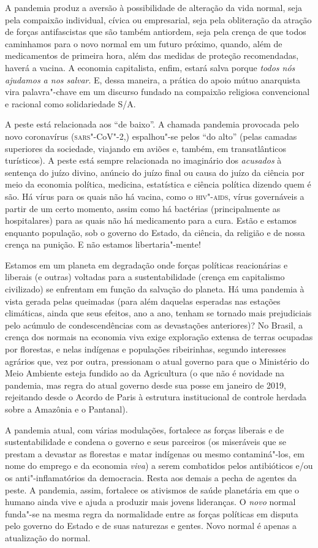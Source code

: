 A pandemia produz a aversão à possibilidade de alteração da vida normal,
seja pela compaixão individual, cívica ou empresarial, seja pela
obliteração da atração de forças antifascistas que são também antiordem,
seja pela crença de que todos caminhamos para o novo normal em um futuro
próximo, quando, além de medicamentos de primeira hora, além das medidas
de proteção recomendadas, haverá a vacina. A economia capitalista,
enfim, estará salva porque \emph{todos nós ajudamos a nos salvar}. E,
dessa maneira, a prática do apoio mútuo anarquista vira palavra"-chave em
um discurso fundado na compaixão religiosa convencional e racional como
solidariedade S/A.

A peste está relacionada aos ``de baixo''. A chamada pandemia provocada
pelo novo coronavírus (\textsc{sars}"-CoV"-2,) espalhou"-se pelos ``do alto'' (pelas
camadas superiores da sociedade, viajando em aviões e, também, em
transatlânticos turísticos). A peste está sempre relacionada no
imaginário dos \emph{acusados} à sentença do juízo divino, anúncio do
juízo final ou causa do juízo da ciência por meio da economia política,
medicina, estatística e ciência política dizendo quem é são. Há vírus
para os quais não há vacina, como o \textsc{hiv"-aids}, vírus governáveis a partir
de um certo momento, assim como há bactérias (principalmente as
hospitalares) para as quais não há medicamento para a cura. Estão e
estamos enquanto população, sob o governo do Estado, da ciência, da
religião e de nossa crença na punição. E não estamos libertaria"-mente!

Estamos em um planeta em degradação onde forças políticas reacionárias e
liberais (e outras) voltadas para a sustentabilidade (crença em
capitalismo civilizado) se enfrentam em função da salvação do planeta.
Há uma pandemia à vista gerada pelas queimadas (para além daquelas
esperadas nas estações climáticas, ainda que seus efeitos, ano a ano,
tenham se tornado mais prejudiciais pelo acúmulo de condescendências com
as devastações anteriores)? No Brasil, a crença dos normais na economia
viva exige exploração extensa de terras ocupadas por florestas, e nelas
indígenas e populações ribeirinhas, segundo interesses agrários que, vez
por outra, pressionam o atual governo para que o Ministério do Meio
Ambiente esteja fundido ao da Agricultura (o que não é novidade na
pandemia, mas regra do atual governo desde sua posse em janeiro de 2019,
rejeitando desde o Acordo de Paris à estrutura institucional de controle
herdada sobre a Amazônia e o Pantanal).

A pandemia atual, com várias modulações, fortalece as forças liberais e
de sustentabilidade e condena o governo e seus parceiros (os miseráveis
que se prestam a devastar as florestas e matar indígenas ou mesmo
contaminá"-los, em nome do emprego e da economia \emph{viva}) a serem
combatidos pelos antibióticos e/ou os anti"-inflamatórios da democracia.
Resta aos demais a pecha de agentes da peste. A pandemia, assim,
fortalece os ativismos de saúde planetária em que o humano ainda vive e
ajuda a produzir mais jovens lideranças. O \emph{novo} normal funda"-se
na mesma regra da normalidade entre as forças políticas em disputa pelo
governo do Estado e de suas naturezas e gentes. Novo normal é apenas a
atualização do normal.

